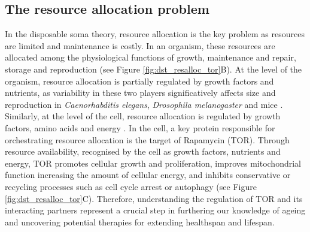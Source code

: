 \subsection{The resource allocation problem}
\label{subsec:The resource allocation problem}
In the disposable soma theory, resource allocation is the key problem as resources are limited and maintenance is costly. In an organism, these resources are allocated among the physiological functions of growth, maintenance and repair, storage and reproduction \citep{Kirkwood2008} (see Figure \ref{fig:dst_resalloc_tor}B). At the level of the organism, resource allocation is partially regulated by growth factors and nutrients, as variability in these two players significatively affects size and reproduction in \emph{Caenorhabditis elegans}, \emph{Drosophila melanogaster} and mice \citep{Holzenberger2001, Walker2005, Bass2007, Kapahi2009, Selman2009}. Similarly, at the level of the cell, resource allocation is regulated by growth factors, amino acids and energy \citep{Sengupta2010, Zoncu2011, Russell2011, Laplante2012}. In the cell, a key protein responsible for orchestrating resource allocation is the target of Rapamycin (TOR). Through resource availability, recognised by the cell as growth factors, 
nutrients and 
energy, TOR promotes cellular growth and proliferation, improves mitochondrial function increasing the amount of cellular energy, and inhibits conservative or recycling processes such as cell cycle arrest or autophagy \citep{Dunlop2009aa, Inoki2006aa, Stanfel2009, Yang2007aa, Kapahi2009} (see Figure \ref{fig:dst_resalloc_tor}C). Therefore, understanding the regulation of TOR and its interacting partners represent a crucial step in furthering our knowledge of ageing and uncovering potential therapies for extending healthspan and lifespan. 

